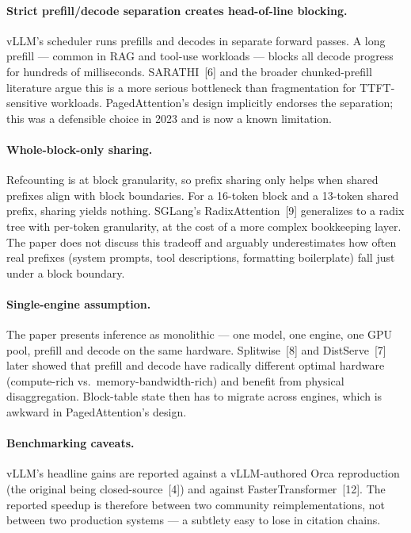 \documentclass{article}
\begin{document}
\paragraph{Strict prefill/decode separation creates head-of-line blocking.} vLLM's scheduler runs prefills and decodes in separate forward passes. A long prefill --- common in RAG and tool-use workloads --- blocks all decode progress for hundreds of milliseconds. SARATHI~[6] and the broader chunked-prefill literature argue this is a more serious bottleneck than fragmentation for TTFT-sensitive workloads. PagedAttention's design implicitly endorses the separation; this was a defensible choice in 2023 and is now a known limitation.

\paragraph{Whole-block-only sharing.} Refcounting is at block granularity, so prefix sharing only helps when shared prefixes align with block boundaries. For a 16-token block and a 13-token shared prefix, sharing yields nothing. SGLang's RadixAttention~[9] generalizes to a radix tree with per-token granularity, at the cost of a more complex bookkeeping layer. The paper does not discuss this tradeoff and arguably underestimates how often real prefixes (system prompts, tool descriptions, formatting boilerplate) fall just under a block boundary.

\paragraph{Single-engine assumption.} The paper presents inference as monolithic --- one model, one engine, one GPU pool, prefill and decode on the same hardware. Splitwise~[8] and DistServe~[7] later showed that prefill and decode have radically different optimal hardware (compute-rich vs.\ memory-bandwidth-rich) and benefit from physical disaggregation. Block-table state then has to migrate across engines, which is awkward in PagedAttention's design.

\paragraph{Benchmarking caveats.} vLLM's headline gains are reported against a vLLM-authored Orca reproduction (the original being closed-source~[4]) and against FasterTransformer~[12]. The reported speedup is therefore between two community reimplementations, not between two production systems --- a subtlety easy to lose in citation chains.
\end{document}
